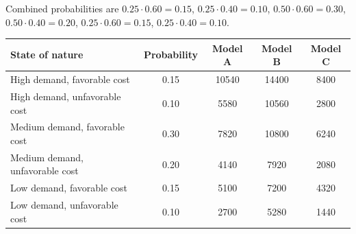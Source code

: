 \begin{ExamProblems}
\begin{center}
		\end{center}
		Combined probabilities are $0.25=0.15$, $0.25=0.10$, $0.50=0.30$, $0.50=0.20$, $0.25=0.15$, $0.25=0.10$.
		\begin{center}
			\begin{tabular}{l c c c c}
				\toprule
				State of nature & Probability & Model A & Model B & Model C \\
				\midrule
				High demand, favorable cost & 0.15 & 10540 & 14400 & 8400 \\
				High demand, unfavorable cost & 0.10 & 5580 & 10560 & 2800 \\
				Medium demand, favorable cost & 0.30 & 7820 & 10800 & 6240 \\
				Medium demand, unfavorable cost & 0.20 & 4140 & 7920 & 2080 \\
				Low demand, favorable cost & 0.15 & 5100 & 7200 & 4320 \\
				Low demand, unfavorable cost & 0.10 & 2700 & 5280 & 1440 \\
				\bottomrule
			\end{tabular}
		\end{center}


\end{ExamProblems}
